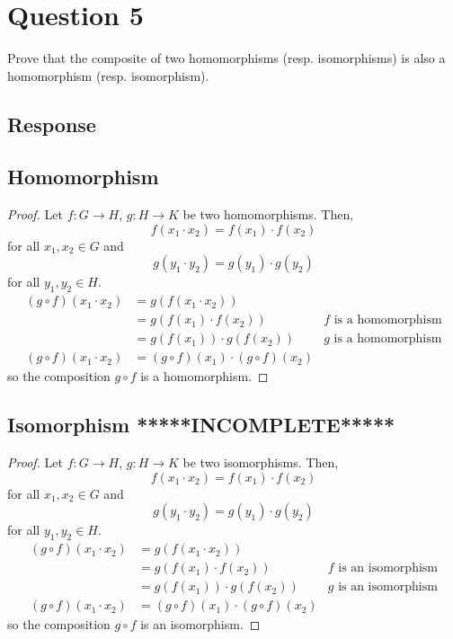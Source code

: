 \documentclass[13pt]{article}
\begin{document}
\newpage
\section*{Question 5}
Prove that the composite of two homomorphisms (resp. isomorphisms) is also a homomorphism
(resp. isomorphism).

\subsection*{Response}
\subsection*{Homomorphism}
\begin{proof}
    Let $f : G \to H$, $g: H \to K$ be two homomorphisms. Then,
    \[f(x_1 \cdot x_2) = f(x_1) \cdot f(x_2)\]
    for all $x_1, x_2 \in G$ and
    \[g(y_1 \cdot y_2) = g(y_1) \cdot g(y_2)\]
    for all $y_1, y_2 \in H$.
    \begin{align*}
        (g \circ f)(x_1 \cdot x_2) &= g(f(x_1 \cdot x_2)) \\
                                  &= g(f(x_1) \cdot f(x_2)) & f \text{ is a homomorphism} \\
                                  &= g(f(x_1)) \cdot g(f(x_2)) & g \text{ is a homomorphism} \\
        (g \circ f)(x_1 \cdot x_2) &= (g \circ f)(x_1) \cdot (g \circ f)(x_2)
    \end{align*}
    so the composition $g \circ f$ is a homomorphism.
\end{proof}


\subsection*{Isomorphism *****INCOMPLETE*****}
\begin{proof}
    Let $f : G \to H$, $g: H \to K$ be two isomorphisms. Then,
    \[f(x_1 \cdot x_2) = f(x_1) \cdot f(x_2)\]
    for all $x_1, x_2 \in G$ and
    \[g(y_1 \cdot y_2) = g(y_1) \cdot g(y_2)\]
    for all $y_1, y_2 \in H$.
    \begin{align*}
        (g \circ f)(x_1 \cdot x_2) &= g(f(x_1 \cdot x_2)) \\
                                  &= g(f(x_1) \cdot f(x_2)) & f \text{ is an isomorphism} \\
                                  &= g(f(x_1)) \cdot g(f(x_2)) & g \text{ is an isomorphism} \\
        (g \circ f)(x_1 \cdot x_2) &= (g \circ f)(x_1) \cdot (g \circ f)(x_2)
    \end{align*}
    so the composition $g \circ f$ is an isomorphism.
\end{proof}
\end{document}
